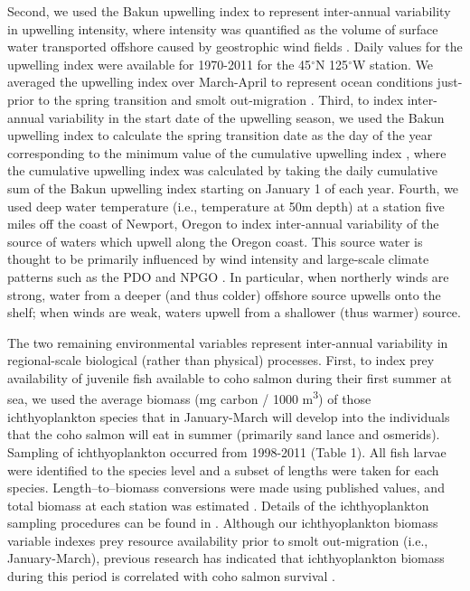 Second, we used the Bakun upwelling index to represent inter-annual variability
in upwelling intensity, where intensity was quantified as the volume of surface
water transported offshore caused by geostrophic wind fields \citep{Bakun1973,
Schwing1996}. Daily values for the upwelling index were available for 1970-2011
for the 45$^{\circ}$N 125$^{\circ}$W station.  We averaged the upwelling index over March-April to
represent ocean conditions just-prior to the spring transition and smolt
out-migration \citep{Logerwell2003a, Lawson1997}. Third, to index inter-annual
variability in the start date of the upwelling season, we used the Bakun
upwelling index to calculate the spring transition date as the day of the year
corresponding to the minimum value of the cumulative upwelling index
\citep{Bakun1973, Bograd2009}, where the cumulative upwelling index was
calculated by taking the daily cumulative sum of the Bakun upwelling index
starting on January 1 of each year. Fourth, we used deep water temperature
(i.e., temperature at 50m depth) at a station five miles off the coast of
Newport, Oregon to index inter-annual variability of the source of waters which
upwell along the Oregon coast. This source water is thought to be primarily
influenced by wind intensity and large-scale climate patterns such as the PDO
and NPGO \citep{Jacox2014, Chhak2007}. In particular, when northerly winds are
strong, water from a deeper (and thus colder) offshore source upwells onto the
shelf; when winds are weak, waters upwell from a shallower (thus warmer) source.

The two remaining environmental variables represent inter-annual variability in
regional-scale biological (rather than physical) processes. First, to index prey
availability of juvenile fish available to coho salmon during their first summer
at sea, we used the average biomass (mg carbon / 1000 m\textsuperscript{3}) of
those ichthyoplankton species that in January-March will develop into the
individuals that the coho salmon will eat in summer (primarily sand lance and
osmerids).  Sampling of ichthyoplankton occurred from 1998-2011 (Table 1). All
fish larvae were identified to the species level and a subset of lengths were
taken for each species. Length--to--biomass conversions were made using
published values, and total biomass at each station was estimated
\citep{Peterson2012a}. Details of the ichthyoplankton sampling procedures can be
found in \citet{Daly2013}. Although our ichthyoplankton biomass variable indexes
prey resource availability prior to smolt out-migration (i.e., January-March),
previous research has indicated that ichthyoplankton biomass during this period
is correlated with coho salmon survival \citep{Daly2013}.

